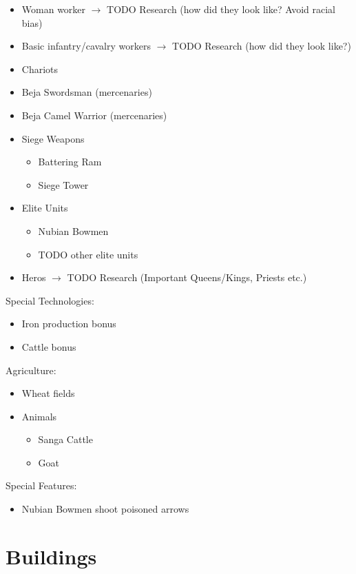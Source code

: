 \documentclass[a4paper,12pt]{scrreprt}
\begin{document}
\begin{itemize}
	\item Woman worker $\rightarrow$ TODO Research (how did they look like? Avoid racial bias)
	\item Basic infantry/cavalry workers $\rightarrow$ TODO Research (how did they look like?)
	\item Chariots
	\item Beja Swordsman (mercenaries)
	\item Beja Camel Warrior (mercenaries)
	\item Siege Weapons
	\begin{itemize}
		\item Battering Ram
		\item Siege Tower
	\end{itemize}
	\item Elite Units
	\begin{itemize}
		\item Nubian Bowmen
		\item TODO other elite units
	\end{itemize}
	\item Heros $\rightarrow$ TODO Research (Important Queens/Kings, Priests etc.)
\end{itemize}

Special Technologies:

\begin{itemize}
	\item Iron production bonus
	\item Cattle bonus
\end{itemize}

Agriculture:

\begin{itemize}
	\item Wheat fields
	\item Animals
	\begin{itemize}
		\item Sanga Cattle
		\item Goat
	\end{itemize}
\end{itemize}
Special Features:

\begin{itemize}
	\item Nubian Bowmen shoot poisoned arrows
\end{itemize}

\section{Buildings}
\end{document}
